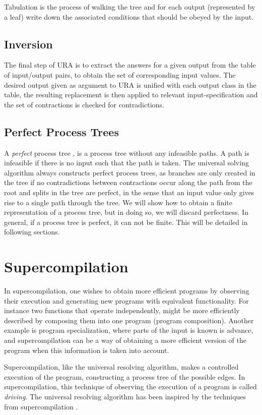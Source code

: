 \documentclass[10pt]{../sigplanconf}
\begin{document}
Tabulation is the process of walking the tree and for each output
(represented by a leaf) write down the associated conditions that
should be obeyed by the input.

\subsection{Inversion}
The final step of URA is to extract the answers for a given output
from the table of input/output pairs, to obtain the set of
corresponding input values. The desired output given as argument to
URA is unified with each output class in the table, the resulting
replacement is then applied to relevant input-specification and the
set of contractions is checked for contradictions.

\subsection{Perfect Process Trees}
A \textit{perfect} process tree \cite{gluck1993occam}, is a process
tree without any infeasible paths. A path is infeasible if there is no
input such that the path is taken. The universal solving algorithm
always constructs perfect process trees, as branches are only created
in the tree if no contradictions between contractions occur along the
path from the root and splits in the tree are perfect, in the sense
that an input value only gives rise to a single path through the
tree. We will show how to obtain a finite representation of a process
tree, but in doing so, we will discard perfectness. In general, if a
process tree is perfect, it can not be finite. This will be detailed
in following sections.

\section{Supercompilation}
In supercompilation, one wishes to obtain more efficient programs by
observing their execution and generating new programs with equivalent
functionality. For instance two functions that operate independently,
might be more efficiently described by composing them into one program
(program composition). Another example is program specialization,
where parts of the input is known is advance, and supercompilation can
be a way of obtaining a more efficient version of the program when
this information is taken into account.

Supercompilation, like the universal resolving algorithm, makes a
controlled execution of the program, constructing a process tree of
the possible edges. In supercompilation, this technique of observing
the execution of a program is called \textit{driving}. The universal
resolving algorithm has been inspired by the techniques from
supercompilation \cite{abramov2002principles}.
\end{document}
